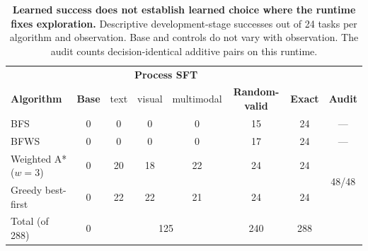 \begin{table}[t]
\caption{\textbf{Learned success does not establish learned choice where the runtime fixes exploration.} Descriptive development-stage successes out of 24 tasks per algorithm and observation. Base and controls do not vary with observation. The audit counts decision-identical additive pairs on this runtime.}
\label{tab:results-identity}
\centering\footnotesize
\setlength{\tabcolsep}{3pt}
\begin{tabular}{@{}l|c|ccc|cc|c@{}}
\toprule[0.4mm]
\rowcolor{mygray} & & \multicolumn{3}{c|}{\textbf{Process SFT}} & & & \\
\rowcolor{mygray}\textbf{Algorithm} & \textbf{Base} & text & visual & multimodal & \textbf{Random-valid} & \textbf{Exact} & \textbf{Audit} \\
\midrule
BFS & 0 & 0 & 0 & 0 & 15 & 24 & --- \\
BFWS & 0 & 0 & 0 & 0 & 17 & 24 & --- \\
Weighted A* ($w{=}3$) & 0 & 20 & 18 & 22 & 24 & 24 & \multirow{2}{*}{48/48} \\
Greedy best-first & 0 & 22 & 22 & 21 & 24 & 24 & \\
\midrule
Total (of 288) & 0 & \multicolumn{3}{c|}{125} & 240 & 288 & \\
\bottomrule
\end{tabular}
\end{table}



